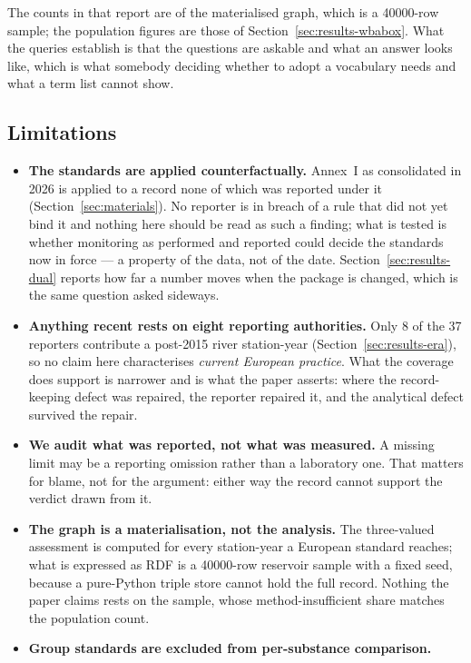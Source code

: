 The counts in that report are of the materialised graph, which is a
\num{40000}-row sample; the population figures are those of
Section~\ref{sec:results-wbabox}. What the queries establish is that the
questions are askable and what an answer looks like, which is what somebody
deciding whether to adopt a vocabulary needs and what a term list cannot show.

\subsection{Limitations}
\begin{itemize}
  \item \textbf{The standards are applied counterfactually.} Annex~I as
    consolidated in \num{2026} is applied to a record none of which was
    reported under it (Section~\ref{sec:materials}). No reporter is in breach
    of a rule that did not yet bind it and nothing here should be read as such
    a finding; what is tested is whether monitoring as performed and reported
    could decide the standards now in force --- a property of the data, not of
    the date. Section~\ref{sec:results-dual} reports how far a number moves
    when the package is changed, which is the same question asked sideways.
  \item \textbf{Anything recent rests on eight reporting authorities.} Only
    \num{8} of the \num{37} reporters contribute a post-\num{2015} river
    station-year (Section~\ref{sec:results-era}), so no claim here
    characterises \emph{current European practice}. What the coverage does
    support is narrower and is what the paper asserts: where the
    record-keeping defect was repaired, the reporter repaired it, and the
    analytical defect survived the repair.
  \item \textbf{We audit what was reported, not what was measured.} A missing
    limit may be a reporting omission rather than a laboratory one. That
    matters for blame, not for the argument: either way the record cannot
    support the verdict drawn from it.
  \item \textbf{The graph is a materialisation, not the analysis.} The
    three-valued assessment is computed for every station-year a European
    standard reaches; what is expressed as RDF is a \num{40000}-row reservoir
    sample with a fixed seed, because a pure-Python triple store cannot hold
    the full record. Nothing the paper claims rests on the sample,
    whose method-insufficient share matches the population count.
  \item \textbf{Group standards are excluded from per-substance comparison.}

\end{itemize}
